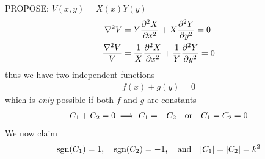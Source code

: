 \documentclass[../main.tex]{subfiles}
\begin{document}
PROPOSE: $V(x,y) = X(x)Y(y)$
\begin{align*}
    \laplacian V &= Y\pdv[2]{X}{x} + X\pdv[2]{Y}{y} = 0 \\
    \frac{\laplacian V}{V} &= \frac{1}{X} \pdv[2]{X}{x} + \frac{1}{Y} \pdv[2]{Y}{y} = 0
\end{align*}
thus we have two independent functions
\begin{align*}
    f(x) + g(y) = 0
\end{align*}
which is \textit{only} possible if both $f$ and $g$ are constants
\begin{align*}
    C_1 + C_2 = 0 \implies C_1 = -C_2 \qor C_1 = C_2 = 0
\end{align*}
We now claim
\begin{align*}
    \sgn(C_1) = 1, \quad \sgn(C_2) = -1, \qand \abs{C_1} = \abs{C_2} = k^2
\end{align*}
\end{document}

